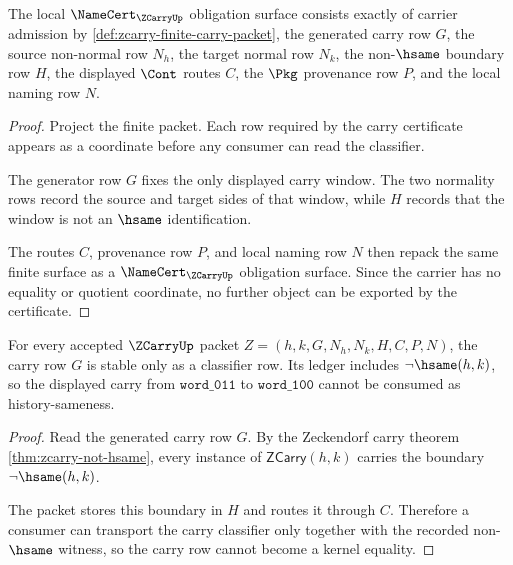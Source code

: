 \begin{theorem}
\label{thm:zcarry-finite-namecert-obligations}
The local $\NameCert_{\ZCarryUp}$ obligation surface consists exactly of carrier
admission by \autoref{def:zcarry-finite-carry-packet}, the generated carry row
$G$, the source non-normal row $N_h$, the target normal row $N_k$, the
non-$\hsame$ boundary row $H$, the displayed $\Cont$ routes $C$, the $\Pkg$
provenance row $P$, and the local naming row $N$.
\end{theorem}
\begin{proof}
Project the finite packet. Each row required by the carry certificate appears as
a coordinate before any consumer can read the classifier.

The generator row $G$ fixes the only displayed carry window. The two normality
rows record the source and target sides of that window, while $H$ records that
the window is not an $\hsame$ identification.

The routes $C$, provenance row $P$, and local naming row $N$ then repack the
same finite surface as a $\NameCert_{\ZCarryUp}$ obligation surface. Since the
carrier has no equality or quotient coordinate, no further object can be
exported by the certificate.
\end{proof}

\begin{theorem}
\label{thm:zcarry-carry-not-hsame-boundary}
For every accepted $\ZCarryUp$ packet $Z=(h,k,G,N_h,N_k,H,C,P,N)$, the carry row
$G$ is stable only as a classifier row. Its ledger includes $\neg\hsame(h,k)$,
so the displayed carry from $\mathtt{word\_011}$ to $\mathtt{word\_100}$ cannot
be consumed as history-sameness.
\end{theorem}
\begin{proof}
Read the generated carry row $G$. By the Zeckendorf carry theorem
\autoref{thm:zcarry-not-hsame}, every instance of $\mathsf{ZCarry}(h,k)$ carries
the boundary $\neg\hsame(h,k)$.

The packet stores this boundary in $H$ and routes it through $C$. Therefore a
consumer can transport the carry classifier only together with the recorded
non-$\hsame$ witness, so the carry row cannot become a kernel equality.
\end{proof}

